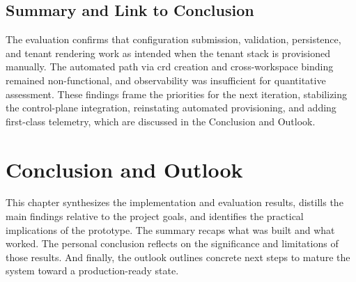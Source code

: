\documentclass[11pt, a4paper, oneside, listof=totoc]{scrartcl}
\begin{document}
        \subsection{Summary and Link to Conclusion}\label{subsec:evalSummaryAndLinkToConclusion}
            The evaluation confirms that configuration submission, validation, persistence, and
            tenant rendering work as intended when the tenant stack is provisioned manually.
            The automated path via \gls{crd} creation and cross-workspace binding remained
            non-functional, and observability was insufficient for quantitative assessment.
            These findings frame the priorities for the next iteration, stabilizing the
            control-plane integration, reinstating automated provisioning, and adding first-class
            telemetry, which are discussed in the Conclusion and Outlook.

    \clearpage

    \section{Conclusion and Outlook}\label{sec:conclusion}
        This chapter synthesizes the implementation and evaluation results, distills the main
        findings relative to the project goals, and identifies the practical implications of the
        prototype.
        The summary recaps what was built and what worked.
        The personal conclusion reflects on the significance and limitations of those results.
        And finally, the outlook outlines concrete next steps to mature the system toward a
        production-ready state.
\end{document}
